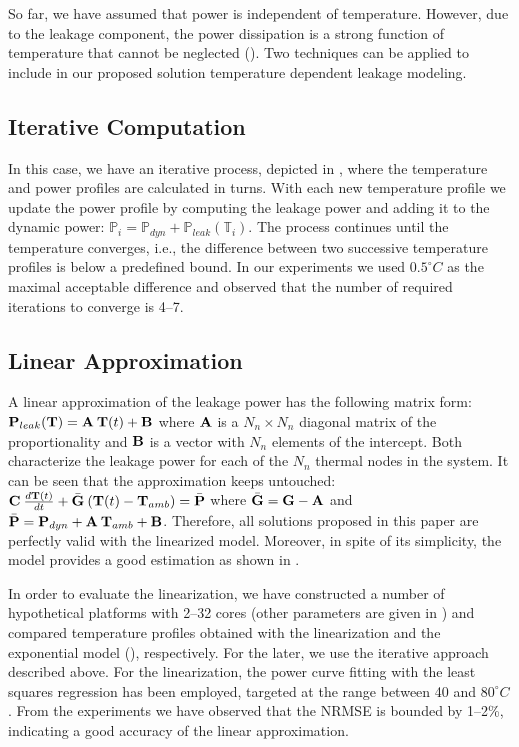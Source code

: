 So far, we have assumed that power is independent of temperature. However, due to the leakage component, the power dissipation is a strong function of temperature that cannot be neglected (). Two techniques can be applied to include in our proposed solution temperature dependent leakage modeling.

\subsection{Iterative Computation} \label{sec:iterative-leakage}
In this case, we have an iterative process, depicted in , where the temperature and power profiles are calculated in turns. With each new temperature profile we update the power profile by computing the leakage power and adding it to the dynamic power: $\mathbb{P}_i = \mathbb{P}_{dyn} + \mathbb{P}_{leak}(\mathbb{T}_i)$. The process continues until the temperature converges, i.e., the difference between two successive temperature profiles is below a predefined bound. In our experiments we used $0.5^\circ C$ as the maximal acceptable difference and observed that the number of required iterations to converge is 4--7.

\subsection{Linear Approximation} \label{sec:linearized-leakage}
A linear approximation of the leakage power has the following matrix form: $\mathbf{P}_{leak}(\mathbf{T}) = \mathbf{A} \: \mathbf{T}(t) + \mathbf{B}$ where $\mathbf{A}$ is a $N_n \times N_n$ diagonal matrix of the proportionality and $\mathbf{B}$ is a vector with $N_n$ elements of the intercept. Both characterize the leakage power for each of the $N_n$ thermal nodes in the system. It can be seen that the approximation keeps  untouched: $\mathbf{C} \: \frac{d\mathbf{T}(t)}{dt} + \bar{\mathbf{G}} \: (\mathbf{T}(t) - \mathbf{T}_{amb}) = \bar{\mathbf{P}}$ where $\bar{\mathbf{G}} = \mathbf{G} - \mathbf{A}$ and $\bar{\mathbf{P}} = \mathbf{P}_{dyn} + \mathbf{A} \: \mathbf{T}_{amb} + \mathbf{B}$. Therefore, all solutions proposed in this paper are perfectly valid with the linearized model. Moreover, in spite of its simplicity, the model provides a good estimation as shown in \cite{liu2007}.

In order to evaluate the linearization, we have constructed a number of hypothetical platforms with 2--32 cores (other parameters are given in ) and compared temperature profiles obtained with the linearization and the exponential model (), respectively. For the later, we use the iterative approach described above. For the linearization, the power curve fitting with the least squares regression \cite{press2007} has been employed, targeted at the range between 40 and $80^\circ C$. From the experiments we have observed that the NRMSE is bounded by 1--2\%, indicating a good accuracy of the linear approximation.
